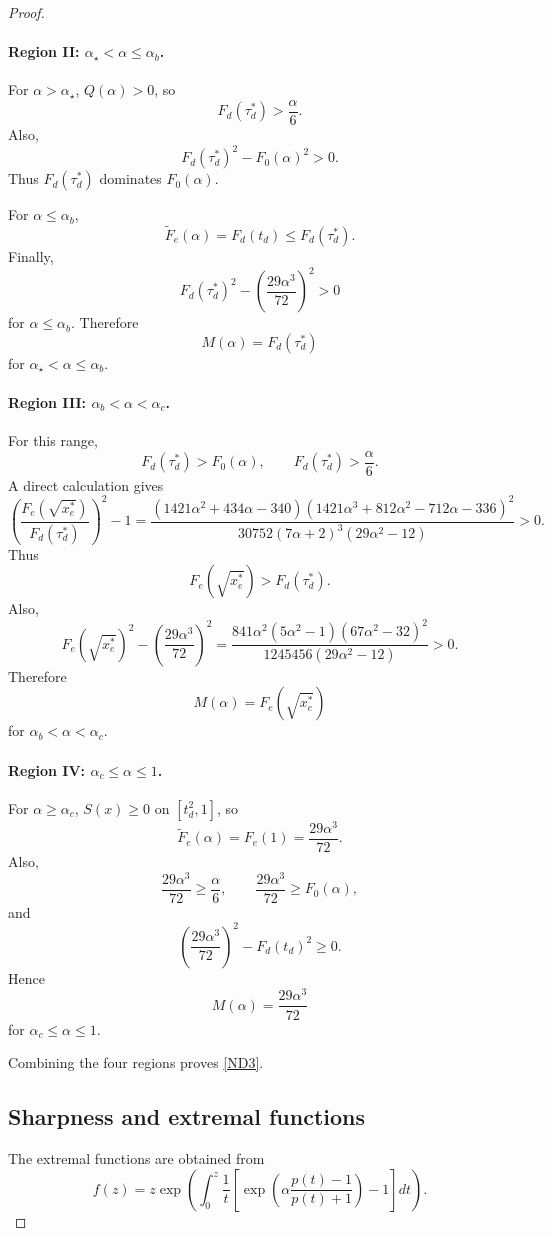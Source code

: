\documentclass[11pt,reqno]{amsart}
\numberwithin{equation}{section}
\begin{document}
\begin{proof}
\paragraph{Region II: $\alpha_\star<\alpha\le\alpha_b$.}
For $\alpha>\alpha_\star$, $Q(\alpha)>0$, so
\[
F_d(\tau_d^*)>\frac{\alpha}{6}.
\]
Also,
\[
F_d(\tau_d^*)^2-F_0(\alpha)^2>0.
\]
Thus $F_d(\tau_d^*)$ dominates $F_0(\alpha)$.

For $\alpha\le\alpha_b$,
\[
\widetilde F_e(\alpha)=F_d(t_d)\le F_d(\tau_d^*).
\]
Finally,
\[
F_d(\tau_d^*)^2
-
\left(\frac{29\alpha^3}{72}\right)^2
>0
\]
for $\alpha\le\alpha_b$. Therefore
\[
M(\alpha)=F_d(\tau_d^*)
\]
for $\alpha_\star<\alpha\le\alpha_b$.

\paragraph{Region III: $\alpha_b<\alpha<\alpha_c$.}
For this range,
\[
F_d(\tau_d^*)>F_0(\alpha),\qquad
F_d(\tau_d^*)>\frac{\alpha}{6}.
\]
A direct calculation gives
\[
\left(
\frac{F_e(\sqrt{x_e^*})}
{F_d(\tau_d^*)}
\right)^2-1
=
\frac{
(1421\alpha^2+434\alpha-340)
(1421\alpha^3+812\alpha^2-712\alpha-336)^2
}
{30752(7\alpha+2)^3(29\alpha^2-12)}
>0.
\]
Thus
\[
F_e(\sqrt{x_e^*})>F_d(\tau_d^*).
\]
Also,
\[
F_e(\sqrt{x_e^*})^2
-
\left(\frac{29\alpha^3}{72}\right)^2
=
\frac{
841\alpha^2(5\alpha^2-1)(67\alpha^2-32)^2
}
{1245456(29\alpha^2-12)}
>0.
\]
Therefore
\[
M(\alpha)=F_e(\sqrt{x_e^*})
\]
for $\alpha_b<\alpha<\alpha_c$.

\paragraph{Region IV: $\alpha_c\le\alpha\le1$.}
For $\alpha\ge\alpha_c$, $S(x)\ge0$ on $[t_d^2,1]$, so
\[
\widetilde F_e(\alpha)=F_e(1)=\frac{29\alpha^3}{72}.
\]
Also,
\[
\frac{29\alpha^3}{72}\ge \frac{\alpha}{6},\qquad
\frac{29\alpha^3}{72}\ge F_0(\alpha),
\]
and
\[
\left(\frac{29\alpha^3}{72}\right)^2
-
F_d(t_d)^2
\ge0.
\]
Hence
\[
M(\alpha)=\frac{29\alpha^3}{72}
\]
for $\alpha_c\le\alpha\le1$.

Combining the four regions proves \eqref{ND3}.

\subsection*{Sharpness and extremal functions}

The extremal functions are obtained from
\begin{equation}\label{pra27}
f(z)
=
z\exp\left(
\int_0^z \frac{1}{t}
\left[
\exp\left(
\alpha\frac{p(t)-1}{p(t)+1}
\right)
-1
\right]
dt
\right).
\end{equation}


\end{proof}
\end{document}
